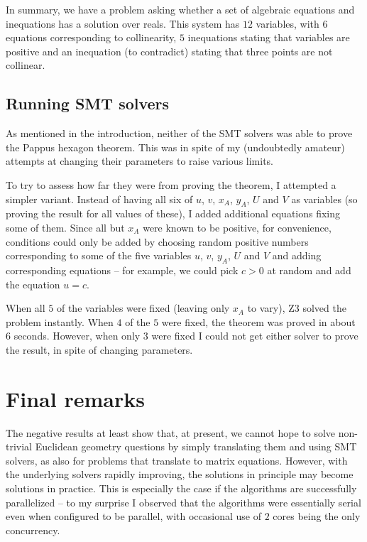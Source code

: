 \documentclass{amsart}
\theoremstyle{plain}
\theoremstyle{definition}
\theoremstyle{remark}
\begin{document}
In summary, we have a problem asking whether a set of algebraic
equations and inequations has a solution over reals. This system has
\(12\) variables, with \(6\) equations corresponding to collinearity,
\(5\) inequations stating that variables are positive and an inequation
(to contradict) stating that three points are not collinear.

\hypertarget{running-smt-solvers}{%
	\subsection{Running SMT solvers}\label{running-smt-solvers}}

As mentioned in the introduction, neither of the SMT solvers was able to
prove the Pappus hexagon theorem. This was in spite of my (undoubtedly
amateur) attempts at changing their parameters to raise various limits.

To try to assess how far they were from proving the theorem, I attempted
a simpler variant. Instead of having all six of \(u\), \(v\), \(x_A\),
\(y_A\), \(U\) and \(V\) as variables (so proving the result for all
values of these), I added additional equations fixing some of them.
Since all but \(x_A\) were known to be positive, for convenience,
conditions could only be added by choosing random positive numbers
corresponding to some of the five variables \(u\), \(v\), \(y_A\), \(U\)
and \(V\) and adding corresponding equations -- for example, we could
pick \(c > 0\) at random and add the equation \(u = c\).

When all \(5\) of the variables were fixed (leaving only \(x_A\) to
vary), Z3 solved the problem instantly. When \(4\) of the \(5\) were
fixed, the theorem was proved in about 6 seconds. However, when only
\(3\) were fixed I could not get either solver to prove the result, in
spite of changing parameters.


\hypertarget{final-remarks}{%
	\section{Final remarks}\label{final-remarks}}

The negative results at least show that, at present, we cannot hope to
solve non-trivial Euclidean geometry questions by simply translating
them and using SMT solvers, as also for problems that translate to
matrix equations. However, with the underlying solvers rapidly
improving, the solutions in principle may become solutions in practice.
This is especially the case if the algorithms are successfully
parallelized -- to my surprise I observed that the algorithms were
essentially serial even when configured to be parallel, with occasional
use of \(2\) cores being the only concurrency.
\end{document}
